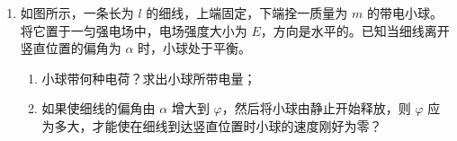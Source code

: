 \documentclass[\gkver]{gaokaozhenti}
\begin{document}
\begin{enumerate}
{当 $n=4$ 时，$v=6800\Ums$；

波速无法取 $6000\Ums$，故波不可能向右传播。

如果波向左传播，传播的最短距离为 $6\Um=\frac{3}{4}\lambda$，由波的周期性得 $6\Um=n\lambda+\frac{3}{4}\lambda$，则波速为
$v=\frac{n\lambda+\frac{3}{4}\lambda}{\Delta t}=\frac{8n+6}{0.005}\Ums=1600n+1200\Ums$，$n$ 取自然数。

当 $n=3$ 时，$v=6000\Ums$，波速可取得 $6000\Ums$，故波向左传播。

评分标准：全题 7 分。（1）2 分，（2）4 分，（3）1 分。（1）中，振幅和波长各占 1 分。（2）中，两个传播速度各占 2 分。（3）中，只有最后答案而无算式或解释说明的，不给分。
}

\item
如图所示，一条长为 $l$ 的细线，上端固定，下端拴一质量为 $m$ 的带电小球。将它置于一匀强电场中，电场强度大小为 $E$，方向是水平的。已知当细线离开竖直位置的偏角为 $\alpha$ 时，小球处于平衡。
\begin{enumerate}
	\item
	小球带何种电荷？求出小球所带电量；
	\item
	如果使细线的偏角由 $\alpha$ 增大到 $\varphi$，然后将小球由静止开始释放，则 $\varphi$ 应为多大，才能使在细线到达竖直位置时小球的速度刚好为零？
\end{enumerate}
\onepicture[align=right, w=4.29cm]{}

{}

\end{enumerate}
\end{document}
